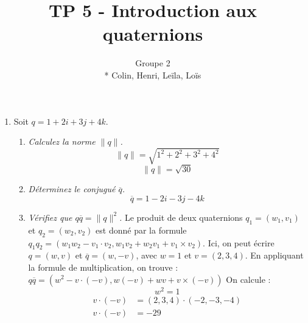 \documentclass[a4paper,12pt]{article}
\title{TP 5 - Introduction aux quaternions}
\author{Groupe 2 \\* Colin, Henri, Leïla, Loïs}
\begin{document}
\maketitle

\begin{enumerate}
    \item Soit \( q = 1 + 2i + 3j + 4k \).
          \begin{enumerate}
              \item \emph{Calculez la norme \( \lVert q \rVert \).}
              \begin{equation}
              \lVert q \rVert = \sqrt{1^2 + 2^2 + 3^2 + 4^2}
              \end{equation}
              \begin{equation}
              \boxed{\lVert q \rVert = \sqrt{30} }
              \end{equation}
              \item \emph{Déterminez le conjugué \( \overline{q} \).}
              \begin{equation}
              \boxed{\overline{q}  = 1 - 2i - 3j - 4k }
              \end{equation}
              \item \emph{Vérifiez que \( q \overline{q} = \lVert q \rVert^2 \).} \newline \newline
              Le produit de deux quaternions \( q_1 = (w_1, v_1) \) et \( q_2 = (w_2, v_2) \) est donné par la formule
              \( q_1 q_2 = (w_1 w_2 − v_1 \cdot v_2, w_1 v_2 + w_2 v_1 + v_1 \times v_2) \). \newline
              Ici, on peut écrire \( q = (w, v) \) et \( \overline{q} = (w, -v) \), avec \( w = 1 \) et \( v = (2, 3, 4) \). \newline
              En appliquant la formule de multiplication, on trouve : \newline
              \(q \overline{q} = (w^2 - v \cdot (-v), w (-v) + w v + v \times (-v))\) \newline
              On calcule :
              \begin{equation}
              w^2 = 1
              \end{equation}
              \begin{align}
              v \cdot (-v) &= (2, 3, 4) \cdot (-2, -3, -4) \\
              v \cdot (-v) &= -29
              \end{align}

\end{enumerate}
\end{enumerate}
\end{document}
